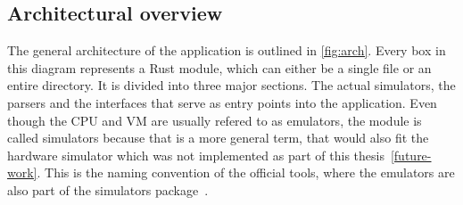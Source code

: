 
\subsection{Architectural overview}
The general architecture of the application is outlined in \cref{fig:arch}. Every box in this diagram represents a Rust module, which can either be a single file or an entire directory.
It is divided into three major sections. The actual simulators, the parsers and the interfaces that serve as entry points into the application. Even though the CPU and VM are usually refered to as emulators, the module is called simulators because that is a more general term, that would also fit the hardware simulator which was not implemented as part of this thesis~\ref{future-work}. This is the naming convention of the official tools, where the emulators are also part of the simulators package~\cite{n2tsimulators}.

